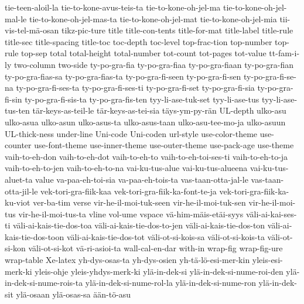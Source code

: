 {tie-teen-aloil-la
tie-to-kone-avus-teis-ta
tie-to-kone-oh-jel-ma
tie-to-kone-oh-jel-mal-le
tie-to-kone-oh-jel-mas-ta
tie-to-kone-oh-jel-mat
tie-to-kone-oh-jel-mia
tii-vis-tel-mä-osan
tikz-pic-ture
title
title-con-tents
title-for-mat
title-label
title-rule
title-sec
title-spacing
title-toc
toc-depth
toc-level
top-frac-tion
top-number
top-rule
top-sep
total
total-height
total-number
tot-count
tot-pages
tot-value
tt-fam-i-ly
two-column
two-side
ty-po-gra-fia
ty-po-gra-fiaa
ty-po-gra-fiaan
ty-po-gra-fian
ty-po-gra-fias-sa
ty-po-gra-fias-ta
ty-po-gra-fi-seen
ty-po-gra-fi-sen
ty-po-gra-fi-se-na
ty-po-gra-fi-ses-ta
ty-po-gra-fi-ses-ti
ty-po-gra-fi-set
ty-po-gra-fi-sia
ty-po-gra-fi-sin
ty-po-gra-fi-sis-ta
ty-po-gra-fis-ten
tyy-li-ase-tuk-set
tyy-li-ase-tus
tyy-li-ase-tus-ten
tär-keys-as-teil-le
tär-keys-as-tei-sia
täys-ym-py-rän
UL-depth
ulko-asu
ulko-asua
ulko-asun
ulko-asus-ta
ulko-asus-taan
ulko-asu-tee-mo-ja
ulko-asuun
UL-thick-ness
under-line
Uni-code
Uni-coden
url-style
use-color-theme
use-counter
use-font-theme
use-inner-theme
use-outer-theme
use-pack-age
use-theme
vaih-to-eh-don
vaih-to-eh-dot
vaih-to-eh-to
vaih-to-eh-toi-ses-ti
vaih-to-eh-to-ja
vaih-to-eh-to-jen
vaih-to-eh-to-na
vai-ku-tus-alue
vai-ku-tus-alueena
vai-ku-tus-aluet-ta
value
va-paa-eh-toi-sia
va-paa-eh-tois-ta
vas-taan-otta-jal-le
vas-taan-otta-jil-le
vek-tori-gra-fiik-kaa
vek-tori-gra-fiik-ka-font-te-ja
vek-tori-gra-fiik-ka-ku-viot
ver-ba-tim
verse
vir-he-il-moi-tuk-seen
vir-he-il-moi-tuk-sen
vir-he-il-moi-tus
vir-he-il-moi-tus-ta
vline
vol-ume
vspace
vä-him-mäis-etäi-syys
väli-ai-kai-ses-ti
väli-ai-kais-tie-dos-toa
väli-ai-kais-tie-dos-to-jen
väli-ai-kais-tie-dos-ton
väli-ai-kais-tie-dos-toon
väli-ai-kais-tie-dos-tot
väli-ot-si-kois-sa
väli-ot-si-kois-ta
väli-ot-si-kon
väli-ot-si-kot
vä-ri-asioi-ta
wall-cal-en-dar
with-in
wrap-fig
wrap-fig-ure
wrap-table
Xe-latex
yh-dys-osas-ta
yh-dys-osien
yh-tä-lö-esi-mer-kin
yleis-esi-merk-ki
yleis-ohje
yleis-yhdys-merk-ki
ylä-in-dek-si
ylä-in-dek-si-nume-roi-den
ylä-in-dek-si-nume-rois-ta
ylä-in-dek-si-nume-rol-la
ylä-in-dek-si-nume-ron
ylä-in-dek-sit
ylä-osaan
ylä-osas-sa
ään-tö-asu
}
